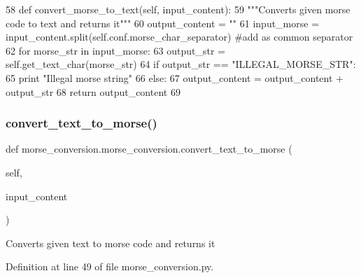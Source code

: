 \begin{DoxyCode}
58     \textcolor{keyword}{def }convert\_morse\_to\_text(self, input\_content):
59         \textcolor{stringliteral}{"""Converts given morse code to text and returns it"""}
60         output\_content = \textcolor{stringliteral}{""}
61         input\_morse = input\_content.split(self.conf.morse\_char\_separator) \textcolor{comment}{#add as common separator}
62         \textcolor{keywordflow}{for} morse\_str \textcolor{keywordflow}{in} input\_morse:
63             output\_str = self.get\_text\_char(morse\_str)
64             \textcolor{keywordflow}{if} output\_str == \textcolor{stringliteral}{"ILLEGAL\_MORSE\_STR"}:
65                 \textcolor{keywordflow}{print} \textcolor{stringliteral}{"Illegal morse string"}
66             \textcolor{keywordflow}{else}:
67                 output\_content = output\_content + output\_str
68         \textcolor{keywordflow}{return} output\_content
69 \end{DoxyCode}
\mbox{\label{classmorse__conversion_1_1morse__conversion_a9c761654a08464e7308dc721adb946fb}} 
\subsubsection{\texorpdfstring{convert\+\_\+text\+\_\+to\+\_\+morse()}{convert\_text\_to\_morse()}}
{\footnotesize\ttfamily def morse\+\_\+conversion.\+morse\+\_\+conversion.\+convert\+\_\+text\+\_\+to\+\_\+morse (\begin{DoxyParamCaption}\item[{}]{self,  }\item[{}]{input\+\_\+content }\end{DoxyParamCaption})}

\begin{DoxyVerb}Converts given text to morse code and returns it\end{DoxyVerb}
 

Definition at line 49 of file morse\+\_\+conversion.\+py.


